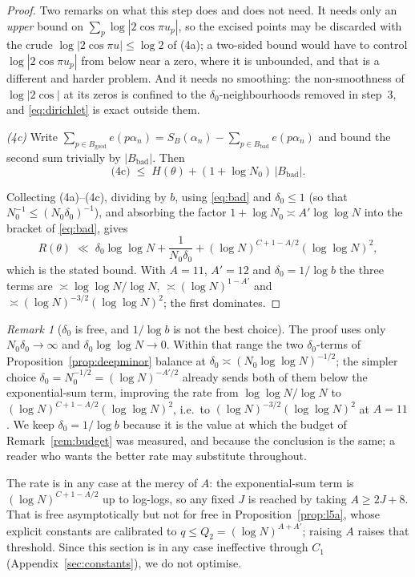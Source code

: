 \documentclass[11pt,a4paper]{article}
\theoremstyle{plain}
\theoremstyle{definition}
\theoremstyle{remark}
\newtheorem{remark}[theorem]{Remark}
\begin{document}
\begin{proof}
Two remarks on what this step does and does not need. It needs only an
\emph{upper} bound on $\sum_p\log|2\cos\pi u_p|$, so the excised points may be
discarded with the crude $\log|2\cos\pi u|\le\log2$ of (4a); a two-sided bound
would have to control $\log|2\cos\pi u_p|$ from below near a zero, where it is
unbounded, and that is a different and harder problem. And it needs no
smoothing: the non-smoothness of $\log|2\cos|$ at its zeros is confined to the
$\delta_0$-neighbourhoods removed in step~3, and \eqref{eq:dirichlet} is exact
outside them.

\emph{(4c)} Write $\sum_{p\in B_{\mathrm{good}}}e(p\alpha_n)
=S_B(\alpha_n)-\sum_{p\in B_{\mathrm{bad}}}e(p\alpha_n)$ and bound the second
sum trivially by $|B_{\mathrm{bad}}|$. Then
\[
  \text{(4c)}\;\le\;H(\theta)+(1+\log N_0)\,|B_{\mathrm{bad}}| .
\]

Collecting (4a)--(4c), dividing by $b$, using \eqref{eq:bad} and $\delta_0\le1$
(so that $N_0^{-1}\le(N_0\delta_0)^{-1}$), and absorbing the factor
$1+\log N_0\asymp A'\log\log N$ into the bracket of \eqref{eq:bad}, gives
\[
  R(\theta)\;\ll\;\delta_0\log\log N+\frac{1}{N_0\delta_0}
    +(\log N)^{C+1-A/2}(\log\log N)^{2},
\]
which is the stated bound. With $A=11$, $A'=12$ and $\delta_0=1/\log b$ the
three terms are $\asymp\log\log N/\log N$, $\asymp(\log N)^{1-A'}$ and
$\asymp(\log N)^{-3/2}(\log\log N)^{2}$; the first dominates.
\end{proof}

\begin{remark}[$\delta_0$ is free, and $1/\log b$ is not the best choice]
\label{rem:delta0}
The proof uses only $N_0\delta_0\to\infty$ and $\delta_0\log\log N\to0$. Within
that range the two $\delta_0$-terms of Proposition~\ref{prop:deepminor} balance
at $\delta_0\asymp(N_0\log\log N)^{-1/2}$; the simpler choice
$\delta_0=N_0^{-1/2}=(\log N)^{-A'/2}$ already sends both of them below the
exponential-sum term, improving the rate from
$\log\log N/\log N$ to $(\log N)^{C+1-A/2}(\log\log N)^{2}$, i.e.\ to
$(\log N)^{-3/2}(\log\log N)^{2}$ at $A=11$. We keep $\delta_0=1/\log b$ because
it is the value at which the budget of Remark~\ref{rem:budget} was measured, and
because the conclusion is the same; a reader who wants the better rate may
substitute throughout.

The rate is in any case at the mercy of $A$: the exponential-sum term is
$(\log N)^{C+1-A/2}$ up to log-logs, so any fixed $J$ is reached by taking
$A\ge2J+8$. That is free asymptotically but not for free in
Proposition~\ref{prop:l5a}, whose explicit constants are calibrated to
$q\le Q_2=(\log N)^{A+A'}$; raising $A$ raises that threshold. Since this
section is in any case ineffective through $C_1$
(Appendix~\ref{sec:constants}), we do not optimise.
\end{remark}
\end{document}
